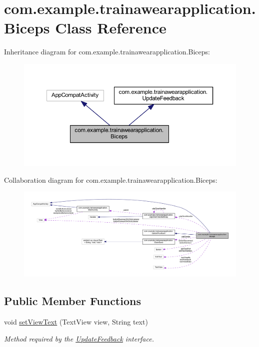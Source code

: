 \hypertarget{classcom_1_1example_1_1trainawearapplication_1_1_biceps}{}\section{com.\+example.\+trainawearapplication.\+Biceps Class Reference}
\label{classcom_1_1example_1_1trainawearapplication_1_1_biceps}


Inheritance diagram for com.\+example.\+trainawearapplication.\+Biceps\+:
\nopagebreak
\begin{figure}[H]
\begin{center}
\leavevmode
\includegraphics[width=350pt]{classcom_1_1example_1_1trainawearapplication_1_1_biceps__inherit__graph}
\end{center}
\end{figure}


Collaboration diagram for com.\+example.\+trainawearapplication.\+Biceps\+:
\nopagebreak
\begin{figure}[H]
\begin{center}
\leavevmode
\includegraphics[width=350pt]{classcom_1_1example_1_1trainawearapplication_1_1_biceps__coll__graph}
\end{center}
\end{figure}
\subsection*{Public Member Functions}
\begin{DoxyCompactItemize}
\item 
void \mbox{\hyperlink{classcom_1_1example_1_1trainawearapplication_1_1_biceps_a6e1ab1b99cd05b29fb7346b0642b7d0e}{set\+View\+Text}} (Text\+View view, String text)
\begin{DoxyCompactList}\small\item\em Method required by the \mbox{\hyperlink{interfacecom_1_1example_1_1trainawearapplication_1_1_update_feedback}{Update\+Feedback}} interface. \end{DoxyCompactList}\end{DoxyCompactItemize}
